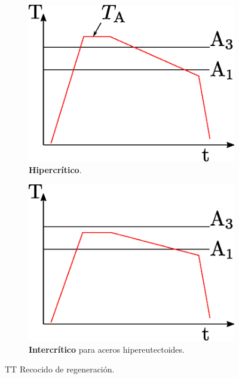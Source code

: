 \begin{figure}[htb!]
\centering
\begin{subfigure}{0.4\textwidth}
    \includegraphics[width=\linewidth]{fig/TTrecoreg.eps}
    \caption{\textbf{Hipercrítico}.}
    \label{fig:TTrecoreg}
\end{subfigure}
\begin{subfigure}{0.4\textwidth}
    \includegraphics[width=\linewidth]{fig/TTrecoreghiper.eps}
    \caption{\textbf{Intercrítico} para aceros hipereutectoides.}
    \label{fig:TTrecoreghiper}
\end{subfigure}
\caption{TT Recocido de regeneración.}
\end{figure}



